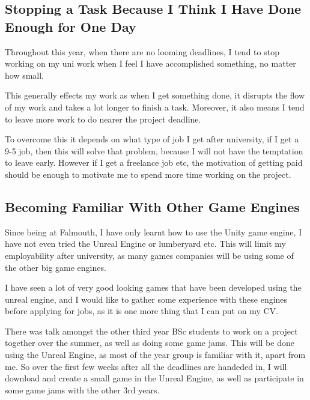 \documentclass{scrartcl}
\begin{document}
\subsection{Stopping a Task Because I Think I Have Done Enough for One Day}

Throughout this year, when there are no looming deadlines, I tend to stop working on my uni work when I feel I have accomplished something, no matter how small.

This generally effects my work as when I get something done, it disrupts the flow of my work and takes a lot longer to finish a task. Moreover, it also means I tend to leave more work to do nearer the project deadline.

To overcome this it depends on what type of job I get after university, if I get a 9-5 job, then this will solve that problem, because I will not have the temptation to leave early. However if I get a freelance job etc, the motivation of getting paid should be enough to motivate me to spend more time working on the project.
\par



\subsection{Becoming Familiar With Other Game Engines}
Since being at Falmouth, I have only learnt how to use the Unity game engine, I have not even tried the Unreal Engine or lumberyard etc. This will limit my employability after university, as many games companies will be using some of the other big game engines.

I have seen a lot of very good looking games that have been developed using the unreal engine, and I would like to gather some experience with these engines before applying for jobs, as it is one more thing that I can put on my CV.

There was talk amongst the other third year BSc students to work on a project together over the summer, as well as doing some game jams. This will be done using the Unreal Engine, as most of the year group is familiar with it, apart from me. So over the first few weeks after all the deadlines are handeded in, I will download and create a small game in the Unreal Engine, as well as participate in some game jams with the other 3rd years.
\par
\end{document}
